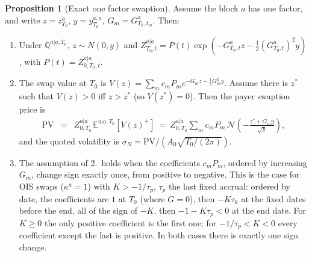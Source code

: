 \documentclass[11pt,english]{amsart}
\newcommand{\EE}{\mathbb{E}}
\newcommand{\QQ}{\mathbb{Q}}
\theoremstyle{definition}
\newtheorem{prop}{Proposition}
\begin{document}
\begin{prop}[Exact one factor swaption]\label{prop:cal_exact_swaption}
Assume the block $a$ has one factor, and write $z = z^a_{T_0}$, $y = y^{a,a}_{T_0}$, $G_m = G^a_{T_0,t_m}$. Then:
\begin{enumerate}
\item Under $\QQ^{a|a,T_0}$, $z\sim N(0,y)$ and $Z^{a|a}_{T_0,t} = P(t)\exp(-G^a_{T_0,t}z - \frac{1}{2}(G^a_{T_0,t})^2y)$, with $P(t) = Z^{a|a}_{0,T_0,t}$.
\item The swap value at $T_0$ is $V(z) = \sum_m c_mP_m e^{-G_mz-\frac{1}{2}G_m^2y}$. Assume there is $z^*$ such that $V(z)>0$ iff $z>z^*$ (so $V(z^*)=0$). Then the payer swaption price is
\begin{eqnarray}
  \mathrm{PV} &=& Z^{a|a}_{0,T_0}\, \EE^{a|a,T_0}\left[V(z)^+\right] ~=~ Z^{a|a}_{0,T_0} \sum_m c_mP_m\, \mathcal{N}\left( -\frac{z^*+G_my}{\sqrt{y}} \right) ,
  \label{eq:cal_exact_swaption}
\end{eqnarray}
and the quoted volatility is $\sigma_N = \mathrm{PV}/(A_0\sqrt{T_0/(2\pi)})$.
\item The assumption of 2.\ holds when the coefficients $c_mP_m$, ordered by increasing $G_m$, change sign exactly once, from positive to negative. This is the case for OIS swaps ($\kappa^a = 1$) with $K > -1/\tau_p$, $\tau_p$ the last fixed accrual: ordered by date, the coefficients are $1$ at $T_0$ (where $G = 0$), then $-K\tau_k$ at the fixed dates before the end, all of the sign of $-K$, then $-1-K\tau_p<0$ at the end date. For $K\ge0$ the only positive coefficient is the first one; for $-1/\tau_p<K<0$ every coefficient except the last is positive. In both cases there is exactly one sign change.
\end{enumerate}
\end{prop}
\end{document}
